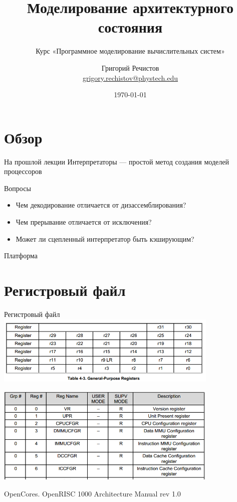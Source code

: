 \documentclass{beamer}
\title{Моделирование архитектурного состояния}
\subtitle{Курс «Программное моделирование вычислительных систем»}
\author[]{Григорий Речистов \\ \small{\href{mailto:grigory.rechistov@phystech.edu}{grigory.rechistov@phystech.edu}}}
\date{\today}
\begin{document}
\begin{frame}
    \maketitle
\end{frame}

\begin{frame}
    \tableofcontents
\end{frame}

\section*{Обзор}

\begin{frame}{На прошлой лекции}
Интерпретаторы --- простой метод создания моделей процессоров

\end{frame}

\begin{frame}{Вопросы}
\begin{itemize}
\item Чем декодирование отличается от дизассемблирования? \pause
\item Чем прерывание отличается от исключения? \pause
\item Может ли сцепленный интерпретатор быть кэширующим?
\end{itemize}

\end{frame}


\begin{frame}{Платформа}
\centering
\vfill

\vfill

\end{frame}

\section{Регистровый файл}

\begin{frame}{Регистровый файл}
\centering
\includegraphics[width=0.8\textwidth]{or1k-gprs}

\includegraphics[width=0.8\textwidth]{or1k-sprs}

\tiny{OpenCores. OpenRISC 1000 Architecture Manual rev 1.0}
\end{frame}
\end{document}
